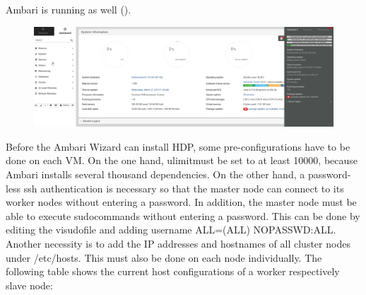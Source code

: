 Ambari is running as well (\cite{RN2}).
\begin{figure}[H]
\hspace{-3.2cm}
\includegraphics[width=1.5\textwidth]{img/figure2_webmin}\label{fig:figure2_webmin}
\label{fig:figure2_webmin}
\end{figure}
Before the Ambari Wizard can install HDP, some pre-configurations have to be done on each VM.
On the one hand, \glqq ulimit\grqq must be set to at least 10000, because Ambari installs several thousand
dependencies. On the other hand, a password-less ssh authentication is necessary so that the
master node can connect to its worker nodes without entering a password. In addition, the master
node must be able to execute \glqq sudo\grqq commands without entering a password. This can be done
by editing the \glqq visudo\grqq file and adding \glqq username ALL=(ALL) NOPASSWD:ALL\grqq . Another
necessity is to add the IP addresses and hostnames of all cluster nodes under \glqq /etc/hosts\grqq . This
must also be done on each node individually. The following table shows the current host
configurations of a worker respectively slave node:
